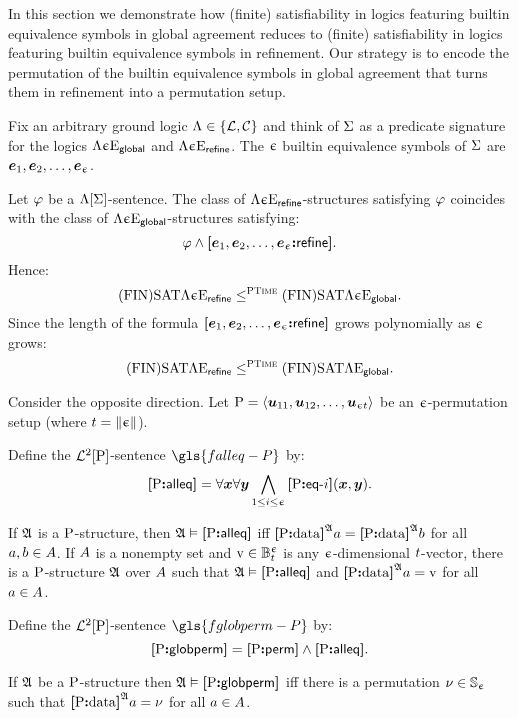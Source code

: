 
In this section we demonstrate how (finite) satisfiability in logics featuring
builtin equivalence symbols in global agreement reduces to (finite)
satisfiability in logics featuring builtin equivalence symbols in refinement.
Our strategy is to encode the permutation of the builtin equivalence symbols in
global agreement that turns them in refinement into a permutation setup.

Fix an arbitrary ground logic $\aL \in \set{\Fo, \Foc}$ and think of $\sigS$ as
a predicate signature for the logics $\aL\Eea\nex\agglobal$ and
$\aL\Eea\nex\agrefine$. The $\nex$ builtin equivalence symbols of $\sigS$ are
$\see1, \see2, \dots, \see\nex$.

Let $\fphi$ be a  $\aLF\sigS$-sentence.
The class of $\aL\Eea\nex\agrefine$-structures satisfying $\fphi$ coincides
with the class of $\aL\Eea\nex\agglobal$-structures satisfying:
\[
  \fphi \land \frefine{\see1,\see2,\dots,\see\nex}.
\]
Hence:
\[
  \FinASat\aL\Eea\nex\agrefine \red\cP \FinASat\aL\Eea\nex\agglobal.
\]
Since the length of the formula $\frefine{\see1,\see2,\dots,\see\nex}$ grows
polynomially as $\nex$ grows:
\[
  \FinASat\aL\Eea\nonex\agrefine \red\cP \FinASat\aL\Eea\nonex\agglobal.
\]

Consider the opposite direction.
Let $\PS = \seq{\suu{11}, \suu{12}, \dots, \suu{\nex\tbit}}$ be an
$\nex$-permutation setup (where $\tbit = \bsz\nex$).
\begin{definition}
Define the $\vFoF2\PS$-sentence $\gls{falleq-P}$ by:
\[
  \falleq\PS = \forall\xx \forall\yy \bigwedge_{1 \leq \ii \leq \nex}
  \feqA\PS\ii(\xx,\yy).
\]
\end{definition}
If $\StrA$ is a $\PS$-structure, then $\StrA \vDash \falleq\PS$ iff
$\data\PS\StrA\ea = \data\PS\StrA\eb$ for all $\ea, \eb \in \domA$.
If $\domA$ is a nonempty set and $\vectv \in \ntBitnums\nex\tbit$ is any
$\nex$-dimensional $\tbit$-vector, there is a $\PS$-structure $\StrA$ over
$\domA$ such that $\StrA \vDash \falleq\PS$ and
$\data\PS\StrA\ea = \vectv$ for all $\ea \in \domA$.

\begin{definition}
Define the $\vFoF2\PS$-sentence $\gls{fglobperm-P}$ by:
\[
  \fglobperm\PS = \fperm\PS \land \falleq\PS.
\]
\end{definition}
If $\StrA$ be a $\PS$-structure then $\StrA \vDash \fglobperm\PS$ iff there
is a permutation $\permnu \in \Perms\nex$ such that
$\data\PS\StrA\ea = \permnu$ for all $\ea \in \domA$.

